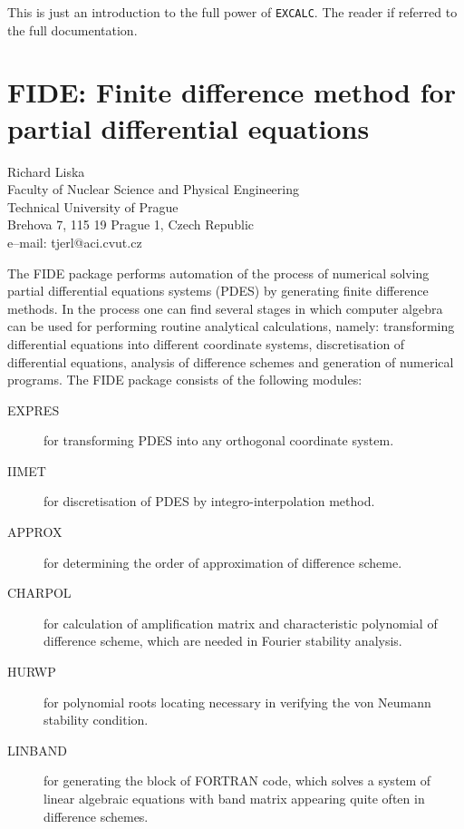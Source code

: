 \documentclass[11pt,letterpaper]{book}
\makeatletter
\newcommand{\underscore}{\_}
\newcommand{\ttindex}[1]{{\renewcommand{\_}{\protect\underscore}%
                          \index{#1@{\tt #1}}}}
\makeatother
\begin{document}
This is just an introduction to the full power of {\tt EXCALC}.  The
reader if referred to the full documentation.

\chapter[FIDE: Finite differences for PDEs]%
        {FIDE: Finite difference method for partial differential equations}
\label{FIDE}

{\footnotesize
\begin{center}
Richard Liska \\
Faculty of Nuclear Science and Physical Engineering \\
Technical University of Prague \\
Brehova 7, 115 19 Prague 1, Czech Republic \\[0.05in]
e--mail: tjerl@aci.cvut.cz
\end{center}
}

\ttindex{FIDE}

The FIDE package performs automation of the process of numerical
solving partial differential equations systems (PDES) by generating
finite difference methods.  In the process one can find several stages
in which computer algebra can be used for performing routine
analytical calculations, namely: transforming differential equations
into different coordinate systems, discretisation of differential
equations, analysis of difference schemes and generation of numerical
programs.  The FIDE package consists of the following modules:

\begin{description}
\item[EXPRES]  for transforming PDES into any orthogonal coordinate system.
\item[IIMET]   for discretisation of PDES by integro-interpolation method.
\item[APPROX]  for determining the order of approximation of
difference scheme.
\item[CHARPOL] for calculation of amplification matrix and
characteristic polynomial of difference scheme, which are needed in
Fourier stability analysis.\
\item[HURWP] for polynomial roots locating necessary in verifying the
von Neumann stability condition.
\item[LINBAND] for generating the block of FORTRAN code, which solves
a system of linear algebraic equations with band matrix appearing
quite often in difference schemes.
\end{description}
\end{document}
